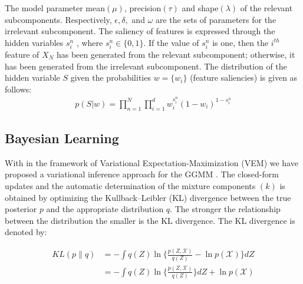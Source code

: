 \documentclass[letterpaper]{article}
\begin{document}
The model parameter mean$(\mu)$, precision$(\tau)$ and shape$(\lambda)$ of the relevant subcomponents.
Respectively, $\epsilon, \delta,$ and $\omega $ are the sets of parameters
for the irrelevant subcomponent. 
The saliency of features is expressed through the hidden variables
$s_i^n$
, where $s_i^n \in \{0, 1\}$. If the value of $s_i^n$
is one, then the $i^{th}$ feature of
$X_N$ has been generated from the relevant subcomponent; otherwise,
it has been generated from the irrelevant subcomponent.
The distribution of the 
hidden variable $S$ given the probabilities $w = \{w_i\}$ (feature
saliencies) is given as follows: 
\begin{equation}
    \begin{split}
        p(S|w) = \prod_{n=1}^N \prod_{i=1}^d w_i^{s_i^n}(1 - w_i)^{1-s_i^n}
    \end{split}
    \end{equation}
\subsection{Bayesian Learning}
With in the framework of Variational Expectation-Maximization (VEM) we have proposed a variational inference approach for the GGMM \cite{b10} \cite{Bishop}.
The closed-form updates and the automatic determination of the mixture components $(k)$ is obtained by optimizing the Kullback–Leibler (KL) divergence between the true posterior $p$ and the appropriate distribution $q$\cite{Bishop}. The stronger the relationship between the distribution the smaller is the KL divergence. The KL divergence is denoted by:

\begin{equation}
    \begin{split}\label{kl}
    KL(p\parallel q) & = - \int q(Z) \ln\{\frac{p(Z,\mathcal{X})}{q(Z)}-\ln p(\mathcal{X})\}dZ \\ &
    = - \int q(Z) \ln\{\frac{p(Z,\mathcal{X})}{q(Z)}\}dZ + \ln p(\mathcal{X})
    \end{split}
 \end{equation}
\end{document}
